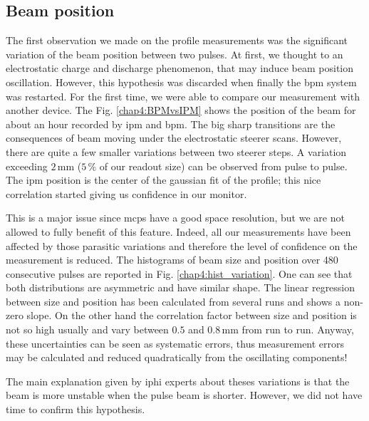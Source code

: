 \begin{refsection}
  \subsection{Beam position}
  \label{chap4:sec:Position}

  The first observation we made on the profile measurements was the significant variation of the beam position between two pulses. At first, we thought to an electrostatic charge and discharge phenomenon, that may induce beam position oscillation. However, this hypothesis was discarded when finally the \acrshort{bpm} system was restarted. For the first time, we were able to compare our measurement with another device. The Fig. \ref{chap4:BPMvsIPM} shows the position of the beam for about an hour recorded by \acrshort{ipm} and \acrshort{bpm}. The big sharp transitions are the consequences of beam moving under the electrostatic steerer scans. However, there are quite a few smaller variations between two steerer steps. A variation exceeding $2\,\mathrm{mm}$ ($5\,\mathrm{\%}$ of our readout size) can be observed from pulse to pulse. The \acrshort{ipm} position is the center of the gaussian fit of the profile; this nice correlation started giving us confidence in our monitor.

  

  This is a major issue since \acrshort{mcp}s have a good space resolution, but we are not allowed to fully benefit of this feature. Indeed, all our measurements have been affected by those parasitic variations and therefore the level of confidence on the measurement is reduced. The histograms of beam size and position over 480 consecutive pulses are reported in Fig. \ref{chap4:hist_variation}. One can see that both distributions are asymmetric and have similar shape. The linear regression between size and position has been calculated from several runs and shows a non-zero slope. On the other hand the correlation factor between size and position is not so high usually and vary between $0.5$ and $0.8\,\mathrm{mm}$ from run to run.
  Anyway, these uncertainties can be seen as systematic errors, thus measurement errors may be calculated and reduced quadratically from the oscillating components!

  

  The main explanation given by \acrshort{iphi} experts about theses variations is that the beam is more unstable when the pulse beam is shorter. However, we did not have time to confirm this hypothesis.


\end{refsection}
